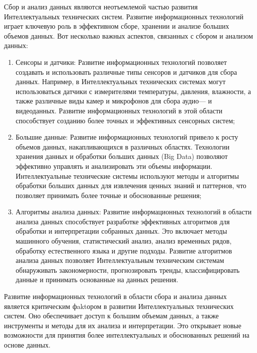     Сбор и анализ данных являются неотъемлемой частью развития Интеллектуальных технических систем. Развитие информационных технологий играет ключевую роль в эффективном сборе, хранении и анализе больших объемов данных. Вот несколько важных аспектов, связанных с сбором и анализом данных:
    \begin{enumerate}
        \item Сенсоры и датчики: Развитие информационных технологий позволяет создавать и использовать различные типы сенсоров и датчиков для сбора данных. Например, в Интеллектуальных технических системах могут использоваться датчики с измерителями температуры, давления, влажности, а также различные виды камер и микрофонов для сбора аудио— и видеоданных. Развитие информационных технологий в этой области способствует созданию более точных и эффективных сенсорных систем;
        \item Большие данные: Развитие информационных технологий привело к росту объемов данных, накапливающихся в различных областях. Технологии хранения данных и обработки больших данных (Big Data) позволяют эффективно управлять и анализировать эти объемы информации. Интеллектуальные технические системы используют методы и алгоритмы обработки больших данных для извлечения ценных знаний и паттернов, что позволяет принимать более точные и обоснованные решения;
        \item Алгоритмы анализа данных: Развитие информационных технологий в области анализа данных способствует разработке эффективных алгоритмов для обработки и интерпретации собранных данных. Это включает методы машинного обучения, статистический анализ, анализ временных рядов, обработку естественного языка и другие подходы. Развитие алгоритмов анализа данных позволяет Интеллектуальным техническим системам обнаруживать закономерности, прогнозировать тренды, классифицировать данные и принимать основанные на данных решения.
    \end{enumerate}

    Развитие информационных технологий в области сбора и анализа данных является критическим фaktором в развитии Интеллектуальных технических систем. Оно обеспечивает доступ к большим объемам данных, а также инструменты и методы для их анализа и интерпретации. Это открывает новые возможности для принятия более интеллектуальных и обоснованных решений на основе данных.

